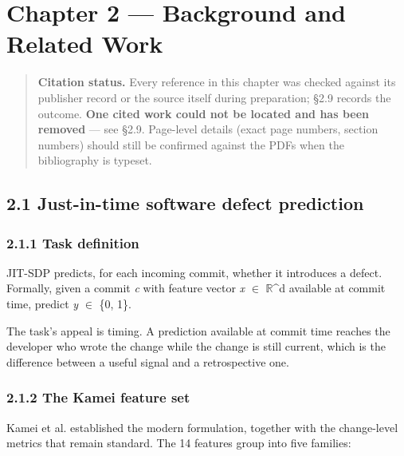 \chapter{Chapter 2 --- Background and Related
Work}\label{chapter-2-background-and-related-work}

\begin{quote}
\textbf{Citation status.} Every reference in this chapter was checked
against its publisher record or the source itself during preparation;
\S{}2.9 records the outcome. \textbf{One cited work could not be located
and has been removed} --- see \S{}2.9. Page-level details (exact page
numbers, section numbers) should still be confirmed against the PDFs
when the bibliography is typeset.
\end{quote}

\section{2.1 Just-in-time software defect
prediction}\label{just-in-time-software-defect-prediction}

\subsection{2.1.1 Task definition}\label{task-definition}

JIT-SDP predicts, for each incoming commit, whether it introduces a
defect. Formally, given a commit \emph{c} with feature vector \emph{x} \ensuremath{\in}
\ensuremath{\mathbb{R}}\^{}d available at commit time, predict \emph{y} \ensuremath{\in} \{0, 1\}.

The task's appeal is timing. A prediction available at commit time
reaches the developer who wrote the change while the change is still
current, which is the difference between a useful signal and a
retrospective one.

\subsection{2.1.2 The Kamei feature set}\label{the-kamei-feature-set}

Kamei et al. \citep{kamei2013jit} established the modern formulation,
together with the change-level metrics that remain standard. The 14
features group into five families:

